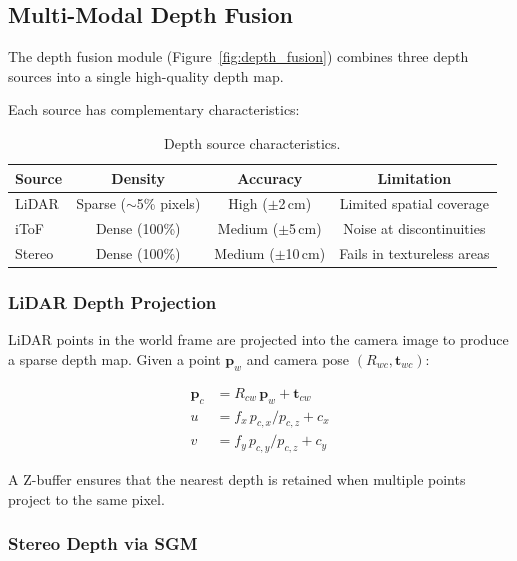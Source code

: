 \subsection{Multi-Modal Depth Fusion}
\label{subsec:depth_fusion}

The depth fusion module (Figure~\ref{fig:depth_fusion}) combines three
depth sources into a single high-quality depth map.



Each source has
complementary characteristics:

\begin{table}[h]
\centering
\caption{Depth source characteristics.}
\label{tab:depth_sources}
\begin{tabular}{lccc}
\toprule
Source & Density & Accuracy & Limitation \\
\midrule
LiDAR  & Sparse ($\sim$5\% pixels) & High ($\pm$2\,cm) & Limited spatial coverage \\
iToF   & Dense (100\%) & Medium ($\pm$5\,cm) & Noise at discontinuities \\
Stereo & Dense (100\%) & Medium ($\pm$10\,cm) & Fails in textureless areas \\
\bottomrule
\end{tabular}
\end{table}

\subsubsection{LiDAR Depth Projection}

LiDAR points in the world frame are projected into the camera image to
produce a sparse depth map. Given a point $\mathbf{p}_w$ and camera pose
$(R_{wc}, \mathbf{t}_{wc})$:

\begin{align}
    \mathbf{p}_c &= R_{cw} \, \mathbf{p}_w + \mathbf{t}_{cw} \\
    u &= f_x \, p_{c,x} / p_{c,z} + c_x \\
    v &= f_y \, p_{c,y} / p_{c,z} + c_y
\end{align}

A Z-buffer ensures that the nearest depth is retained when multiple
points project to the same pixel.

\subsubsection{Stereo Depth via SGM}

